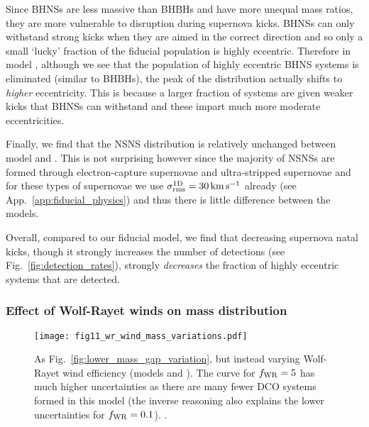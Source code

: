 Since BHNSs are less massive than BHBHs and have more unequal mass ratios, they are more vulnerable to disruption during supernova kicks. BHNSs can only withstand strong kicks when they are aimed in the correct direction and so only a small `lucky' fraction of the fiducial population is highly eccentric. Therefore in model \modSigLower{}, although we see that the population of highly eccentric BHNS systems is eliminated (similar to BHBHs), the peak of the distribution actually shifts to \textit{higher} eccentricity. This is because a larger fraction of systems are given weaker kicks that BHNSs can withstand and these impart much more moderate eccentricities.

Finally, we find that the NSNS distribution is relatively unchanged between model \modFid{} and \modSigLower{}. This is not surprising however since the majority of NSNSs are formed through electron-capture supernovae and ultra-stripped supernovae and for these types of supernovae we use $\sigma^{\rm 1D}_{\rm rms} = 30 \unit{km}{s^{-1}}$ already (see App.~\ref{app:fiducial_physics}) and thus there is little difference between the models.

Overall, compared to our fiducial model, we find that decreasing supernova natal kicks, though it strongly increases the number of detections (see Fig.~\ref{fig:detection_rates}), strongly \textit{decreases} the fraction of highly eccentric systems that are detected.

\subsubsection{Effect of Wolf-Rayet winds on mass distribution}

\begin{figure}[tb]
    \centering
    \texttt{[image: fig11\_wr\_wind\_mass\_variations.pdf]}
    \caption{As Fig.~\ref{fig:lower_mass_gap_variation}, but instead varying Wolf-Rayet wind efficiency (models \modWRLow{} and \modWRHigh{}). The curve for $f_{\rm WR} = 5$ has much higher uncertainties as there are many fewer DCO systems formed in this model (the inverse reasoning also explains the lower uncertainties for $f_{\rm WR} = 0.1$). \href{https://github.com/TomWagg/detecting-DCOs-in-LISA/blob/main/paper/figures/fig11_wr_wind_mass_variations.pdf}{\faFileImage} \href{https://github.com/TomWagg/detecting-DCOs-in-LISA/blob/main/paper/figure_notebooks/variations.ipynb}{\faBook}.}
    \label{fig:wr_wind_mass_variations}
\end{figure}

